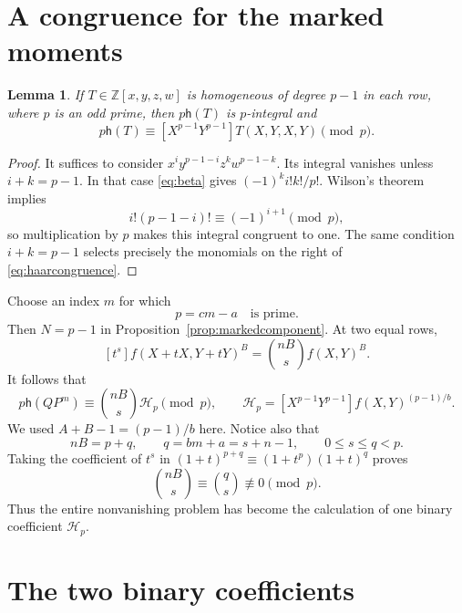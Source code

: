 \documentclass[11pt]{article}
\numberwithin{equation}{section}
\newtheorem{lemma}[theorem]{Lemma}
\theoremstyle{definition}
\theoremstyle{remark}
\newcommand{\Z}{\mathbb Z}
\newcommand{\h}{\mathsf h}
\begin{document}
\section{A congruence for the marked moments}\label{sec:congruence}

\begin{lemma}\label{lem:haarcongruence}
If $T\in\Z[x,y,z,w]$ is homogeneous of degree $p-1$ in each row,
where $p$ is an odd prime, then $p\h(T)$ is $p$-integral and
\begin{equation}\label{eq:haarcongruence}
 p\h(T)\equiv[X^{p-1}Y^{p-1}]T(X,Y,X,Y)\pmod p.
\end{equation}
\end{lemma}
\begin{proof}
It suffices to consider $x^iy^{p-1-i}z^kw^{p-1-k}$. Its integral
vanishes unless $i+k=p-1$. In that case \eqref{eq:beta} gives
$(-1)^ki!k!/p!$. Wilson's theorem implies
\[
 i!(p-1-i)!\equiv(-1)^{i+1}\pmod p,
\]
so multiplication by $p$ makes this integral congruent to one.
The same condition $i+k=p-1$ selects precisely the monomials on the
right of \eqref{eq:haarcongruence}.
\end{proof}

Choose an index $m$ for which
\begin{equation}\label{eq:primeindex}
 p=cm-a\quad\text{is prime}.
\end{equation}
Then $N=p-1$ in Proposition~\ref{prop:markedcomponent}. At two equal rows,
\[
 [t^s]f(X+tX,Y+tY)^B=\binom{nB}{s}f(X,Y)^B.
\]
It follows that
\begin{equation}\label{eq:keycongruence}
 p\h(QP^m)\equiv\binom{nB}{s}\mathcal H_p\pmod p,
 \qquad
 \mathcal H_p=[X^{p-1}Y^{p-1}]f(X,Y)^{(p-1)/b}.
\end{equation}
We used $A+B-1=(p-1)/b$ here. Notice also that
\[
 nB=p+q,\qquad q=bm+a=s+n-1,\qquad 0\leq s\leq q<p.
\]
Taking the coefficient of $t^s$ in
$(1+t)^{p+q}\equiv(1+t^p)(1+t)^q$ proves
\begin{equation}\label{eq:binomialunit}
 \binom{nB}{s}\equiv\binom qs\not\equiv0\pmod p.
\end{equation}
Thus the entire nonvanishing problem has become the calculation of
one binary coefficient $\mathcal H_p$.

\section{The two binary coefficients}\label{sec:klein}
\end{document}
